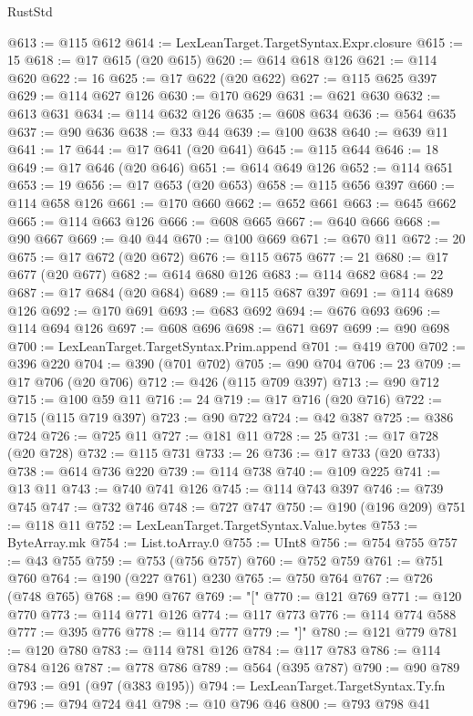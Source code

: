 \begin{lexlean}{RustStd}
\begin{coremodule}
{\begin{coremodule}
{{{{{{{{{{{{{{{{{{{{{{{{{{{{{{{{{{{{{{{{{{{{{{{{{{@613 := @115 @612
@614 := LexLeanTarget.TargetSyntax.Expr.closure
@615 := 15
@618 := @17 @615 (@20 @615)
@620 := @614 @618 @126
@621 := @114 @620
@622 := 16
@625 := @17 @622 (@20 @622)
@627 := @115 @625 @397
@629 := @114 @627 @126
@630 := @170 @629
@631 := @621 @630
@632 := @613 @631
@634 := @114 @632 @126
@635 := @608 @634
@636 := @564 @635
@637 := @90 @636
@638 := @33 @44
@639 := @100 @638
@640 := @639 @11
@641 := 17
@644 := @17 @641 (@20 @641)
@645 := @115 @644
@646 := 18
@649 := @17 @646 (@20 @646)
@651 := @614 @649 @126
@652 := @114 @651
@653 := 19
@656 := @17 @653 (@20 @653)
@658 := @115 @656 @397
@660 := @114 @658 @126
@661 := @170 @660
@662 := @652 @661
@663 := @645 @662
@665 := @114 @663 @126
@666 := @608 @665
@667 := @640 @666
@668 := @90 @667
@669 := @40 @44
@670 := @100 @669
@671 := @670 @11
@672 := 20
@675 := @17 @672 (@20 @672)
@676 := @115 @675
@677 := 21
@680 := @17 @677 (@20 @677)
@682 := @614 @680 @126
@683 := @114 @682
@684 := 22
@687 := @17 @684 (@20 @684)
@689 := @115 @687 @397
@691 := @114 @689 @126
@692 := @170 @691
@693 := @683 @692
@694 := @676 @693
@696 := @114 @694 @126
@697 := @608 @696
@698 := @671 @697
@699 := @90 @698
@700 := LexLeanTarget.TargetSyntax.Prim.append
@701 := @419 @700
@702 := @396 @220
@704 := @390 (@701 @702)
@705 := @90 @704
@706 := 23
@709 := @17 @706 (@20 @706)
@712 := @426 (@115 @709 @397)
@713 := @90 @712
@715 := @100 @59 @11
@716 := 24
@719 := @17 @716 (@20 @716)
@722 := @715 (@115 @719 @397)
@723 := @90 @722
@724 := @42 @387
@725 := @386 @724
@726 := @725 @11
@727 := @181 @11
@728 := 25
@731 := @17 @728 (@20 @728)
@732 := @115 @731
@733 := 26
@736 := @17 @733 (@20 @733)
@738 := @614 @736 @220
@739 := @114 @738
@740 := @109 @225
@741 := @13 @11
@743 := @740 @741 @126
@745 := @114 @743 @397
@746 := @739 @745
@747 := @732 @746
@748 := @727 @747
@750 := @190 (@196 @209)
@751 := @118 @11
@752 := LexLeanTarget.TargetSyntax.Value.bytes
@753 := ByteArray.mk
@754 := List.toArray.{0}
@755 := UInt8
@756 := @754 @755
@757 := @43 @755
@759 := @753 (@756 @757)
@760 := @752 @759
@761 := @751 @760
@764 := @190 (@227 @761) @230
@765 := @750 @764
@767 := @726 (@748 @765)
@768 := @90 @767
@769 := "["
@770 := @121 @769
@771 := @120 @770
@773 := @114 @771 @126
@774 := @117 @773
@776 := @114 @774 @588
@777 := @395 @776
@778 := @114 @777
@779 := "]"
@780 := @121 @779
@781 := @120 @780
@783 := @114 @781 @126
@784 := @117 @783
@786 := @114 @784 @126
@787 := @778 @786
@789 := @564 (@395 @787)
@790 := @90 @789
@793 := @91 (@97 (@383 @195))
@794 := LexLeanTarget.TargetSyntax.Ty.fn
@796 := @794 @724 @41
@798 := @10 @796 @46
@800 := @793 @798 @41
}}}}}}}}}}}}}}}}}}}}}}}}}}}}}}}}}}}}}}}}}}}}}}}}}}
\end{coremodule}}
\end{coremodule}
\end{lexlean}
